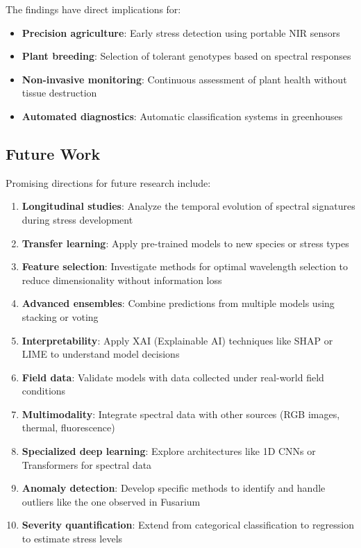 \documentclass[12pt,a4paper]{article}
\begin{document}
The findings have direct implications for:

\begin{itemize}
    \item \textbf{Precision agriculture}: Early stress detection using portable NIR sensors
    \item \textbf{Plant breeding}: Selection of tolerant genotypes based on spectral responses
    \item \textbf{Non-invasive monitoring}: Continuous assessment of plant health without tissue destruction
    \item \textbf{Automated diagnostics}: Automatic classification systems in greenhouses
\end{itemize}

\subsection{Future Work}

Promising directions for future research include:

\begin{enumerate}
    \item \textbf{Longitudinal studies}: Analyze the temporal evolution of spectral signatures during stress development
    
    \item \textbf{Transfer learning}: Apply pre-trained models to new species or stress types
    
    \item \textbf{Feature selection}: Investigate methods for optimal wavelength selection to reduce dimensionality without information loss
    
    \item \textbf{Advanced ensembles}: Combine predictions from multiple models using stacking or voting
    
    \item \textbf{Interpretability}: Apply XAI (Explainable AI) techniques like SHAP or LIME to understand model decisions
    
    \item \textbf{Field data}: Validate models with data collected under real-world field conditions
    
    \item \textbf{Multimodality}: Integrate spectral data with other sources (RGB images, thermal, fluorescence)
    
    \item \textbf{Specialized deep learning}: Explore architectures like 1D CNNs or Transformers for spectral data
    
    \item \textbf{Anomaly detection}: Develop specific methods to identify and handle outliers like the one observed in Fusarium
    
    \item \textbf{Severity quantification}: Extend from categorical classification to regression to estimate stress levels
\end{enumerate}
\end{document}

